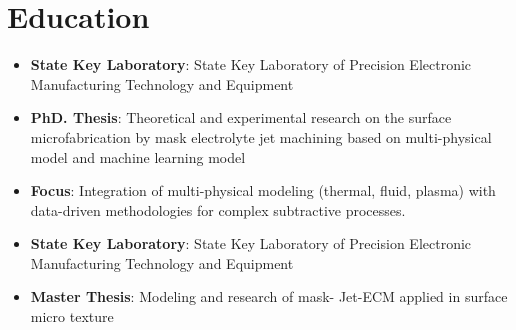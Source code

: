 \documentclass{resume}
\begin{document}
\section{Education}
\begin{itemize} [parsep=1ex]
  \item \textbf{State Key Laboratory}: State Key Laboratory of Precision Electronic Manufacturing Technology and Equipment
  \item \textbf{PhD. Thesis}: Theoretical and experimental research on the surface microfabrication by mask electrolyte jet machining based on multi-physical model and machine learning model
  \item \textbf{Focus}: Integration of multi-physical modeling (thermal, fluid, plasma) with data-driven methodologies for complex subtractive processes.
\end{itemize}

\begin{itemize} [parsep=1ex]
  \item \textbf{State Key Laboratory}: State Key Laboratory of Precision Electronic Manufacturing Technology and Equipment
  \item \textbf{Master Thesis}: Modeling and research of mask- Jet-ECM applied in surface micro texture
\end{itemize}


\vspace{5mm}
\end{document}
